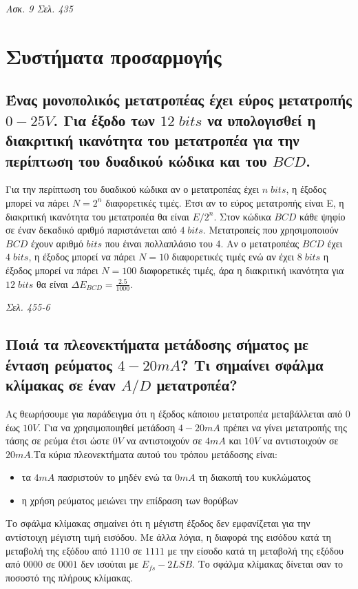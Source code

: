 \documentclass{article}
\begin{document}
\emph{Ασκ. 9 Σελ. 435}

\section{Συστήματα προσαρμογής}
\subsection{Ένας μονοπολικός μετατροπέας έχει εύρος μετατροπής $0-25V$. Για έξοδο των $12\; bits$ να υπολογισθεί η διακριτική ικανότητα του μετατροπέα για την περίπτωση 
του δυαδικού κώδικα και του $BCD$.}
Για την περίπτωση του δυαδικού κώδικα αν ο μετατροπέας έχει $n\; bits$, η έξοδος μπορεί να πάρει $N=2^n$ διαφορετικές τιμές. Έτσι αν το εύρος μετατροπής είναι Ε, η διακριτική
ικανότητα του μετατροπέα θα είναι $E/2^n$. Στον κώδικα $BCD$ κάθε ψηφίο σε έναν δεκαδικό αριθμό παριστάνεται από $4\; bits$. Μετατροπείς που χρησιμοποιούν $BCD$ 
έχουν αριθμό $bits$ που έιναι πολλαπλάσιο του 4. Αν ο μετατροπέας $BCD$ έχει $4\; bits$, η έξοδος μπορεί να πάρει $N=10$ διαφορετικές τιμές ενώ αν έχει $8\; bits$ η
έξοδος μπορεί να πάρει $N=100$ διαφορετικές τιμές, άρα η διακριτική ικανότητα για $12\; bits$ θα είναι $\Delta E_{BCD}=\frac{2.5}{1000}$.

\emph{Σελ. 455-6}

\subsection{Ποιά τα πλεονεκτήματα μετάδοσης σήματος με ένταση ρεύματος $4-20mA$? Τι σημαίνει σφάλμα κλίμακας σε έναν $A/D$ μετατροπέα?}
Ας θεωρήσουμε για παράδειγμα ότι η έξοδος κάποιου μετατροπέα μεταβάλλεται από $0$ έως $10V$. Για να χρησιμοποιηθεί μετάδοση $4-20 mA$ πρέπει να γίνει μετατροπής της 
τάσης σε ρεύμα έτσι ώστε $0V$ να αντιστοιχούν σε $4 mA$ και $10V$ να αντιστοιχούν σε $20 mA$.Τα κύρια πλεονεκτήματα αυτού του τρόπου μετάδοσης είναι:

\begin{itemize}
    \item τα $4mA$ πασριστούν το μηδέν ενώ τα $0mA$ τη διακοπή του κυκλώματος
    \item η χρήση ρεύματος μειώνει την επίδραση των θορύβων
\end{itemize}

Το σφάλμα κλίμακας σημαίνει ότι η μέγιστη έξοδος δεν εμφανίζεται για την αντίστοιχη μέγιστη τιμή εισόδου. Με άλλα λόγια, η διαφορά της εισόδου κατά τη μεταβολή της 
εξόδου από $1110$ σε $1111$ με την είσοδο κατά τη μεταβολή της εξόδου από $0000$ σε $0001$ δεν ισούται με $E_{fs}-2LSB$. Το σφάλμα κλίμακας δίνεται σαν το ποσοστό 
της πλήρους κλίμακας.
\end{document}
